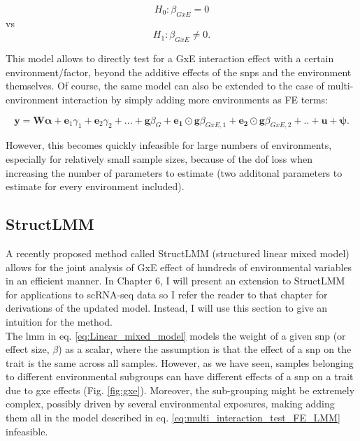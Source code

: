 \begin{equation}
 H_{0}: \beta_{GxE}=0 
\end{equation}
vs
\begin{equation}
 H_{1}: \beta_{GxE} \neq 0. 
\end{equation}

This model allows to directly test for a GxE interaction effect with a certain environment/factor, beyond the additive effects of the \gls{snp}s and the environment themselves. 
Of course, the same model can also be extended to the case of multi-environment interaction by simply adding more environments as FE terms:

\begin{equation}\label{eq:multi_interaction_test_FE_LMM}
 \mathbf{y} =  \mathbf{W}\boldsymbol{\alpha} + \mathbf{e}_1\gamma_1 + \mathbf{e}_2\gamma_2 + ...  + \mathbf{g}\beta_G + \mathbf{e_1}\odot\mathbf{g}\beta_{GxE,1}+ \mathbf{e_2}\odot\mathbf{g}\beta_{GxE,2} + .. + \mathbf{u} + \boldsymbol{\psi}. 
\end{equation}

However, this becomes quickly infeasible for large numbers of environments, especially for relatively small sample sizes, because of the dof loss when increasing the number of parameters to estimate (two additonal parameters to estimate for every environment included).


\subsection{StructLMM}

A recently proposed method called StructLMM (structured linear mixed model) allows for the joint analysis of GxE effect of hundreds of environmental variables \cite{moore2019linear} in an efficient manner.
In Chapter 6, I will present an extension to StructLMM for applications to scRNA-seq data so I refer the reader to that chapter for derivations of the updated model.
Instead, I will use this section to give an intuition for the method.\\

The \gls{lmm} in eq. \eqref{eq:Linear_mixed_model} models the weight of a given \gls{snp} (or effect size, $\beta$) as a scalar, where the assumption is that the effect of a \gls{snp} on the trait is the same across all samples.
However, as we have seen, samples belonging to different environmental subgroups can have different effects of a \gls{snp} on a trait due to \gls{gxe} effects (Fig. \ref{fig:gxe}).
Moreover, the sub-grouping might be extremely complex, possibly driven by several environmental exposures, making adding them all in the model described in eq. \eqref{eq:multi_interaction_test_FE_LMM} infeasible.\\

